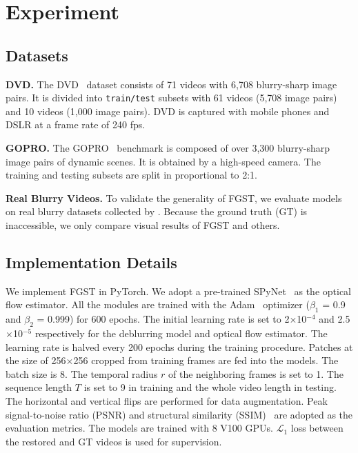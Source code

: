 \documentclass{article}
\begin{document}
	\section{Experiment}
	\vspace{0mm}
\subsection{Datasets}
	\textbf{DVD.} The DVD~\cite{Su} dataset consists of 71 videos with 6,708 blurry-sharp image pairs. It is divided into \texttt{train/test} subsets with 61 videos (5,708 image pairs) and 10 videos (1,000 image pairs). DVD is captured with mobile phones and DSLR at a frame rate of 240 fps.
	
	\noindent\textbf{GOPRO.} The GOPRO~\cite{GoPro} benchmark is composed of over 3,300 blurry-sharp image pairs of dynamic scenes. It is obtained by a high-speed camera. The training and testing subsets are split in proportional to 2:1. 
	
	\noindent\textbf{Real Blurry Videos.} To validate the generality of FGST, we evaluate models on real blurry datasets collected by \cite{real_blur}. Because the ground truth (GT) is inaccessible, we only compare visual results of FGST and others.
	
\vspace{-2mm}
	\subsection{Implementation Details}
	We implement FGST in PyTorch. We adopt a pre-trained SPyNet~\cite{spynet} as the optical flow estimator. All the modules are trained with the Adam~\cite{adam} optimizer ($\beta_1$ = 0.9 and $\beta_2$ = 0.999) for 600 epochs. The initial learning rate is set to 2$\times$10$^{-4}$ and 2.5$\times$10$^{-5}$ respectively for the deblurring model and optical flow estimator. The learning rate is halved every 200 epochs during the training procedure. Patches at the size of  256$\times$256 cropped from training frames are fed into the models. The batch size is 8. The temporal radius $r$ of the neighboring frames is set to 1. The sequence length $T$ is set to 9 in training and the whole video length in testing. The horizontal and vertical flips are performed for data augmentation. Peak signal-to-noise ratio (PSNR) and structural similarity (SSIM)~\cite{ssim} are adopted as the evaluation metrics. The models are trained with 8 V100 GPUs. $\mathcal{L}_1$ loss between the restored and GT videos is used for supervision.
	
\end{document}
